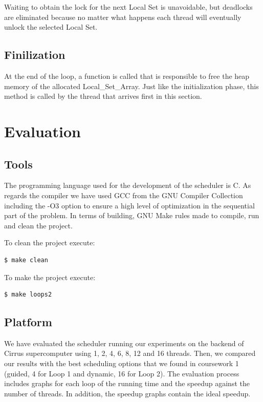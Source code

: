 \documentclass[12pt,a4paper]{article}
\newcommand{\sectionVspacing}{\vspace{15pt}}
\begin{document}
Waiting to obtain the lock for the next Local Set is unavoidable, but deadlocks are eliminated because no matter what happens each thread will eventually unlock the selected Local Set.

\subsection{Finilization}
At the end of the loop, a function is called that is responsible to free the heap memory of the allocated Local\_Set\_Array. Just like the initialization phase, this method is called by the thread that arrives first in this section.

\sectionVspacing

\section{Evaluation}

\subsection{Tools}

The programming language used for the development of the scheduler is C. As regards the compiler we have used GCC from the GNU Compiler Collection including the -O3 option to ensure a high level of optimization in the sequential part of the problem. In terms of building, GNU Make rules made to compile, run and clean the project.

To clean the project execute:
\begin{lstlisting}[language=bash]
  $ make clean
\end{lstlisting}

To make the project execute:
\begin{lstlisting}[language=bash]
  $ make loops2
\end{lstlisting}

\subsection{Platform}

We have evaluated the scheduler running our experiments on the backend of Cirrus supercomputer using 1, 2, 4, 6, 8, 12 and 16 threads. Then, we compared our results with the best scheduling options that we found in coursework 1 (guided, 4 for Loop 1 and dynamic, 16 for Loop 2). The evaluation process includes graphs for each loop of the running time and the speedup against the number of threads. In addition, the speedup graphs contain the ideal speedup.
\end{document}

